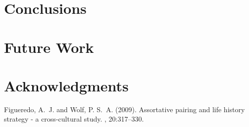 \documentclass[twoside]{article}
\begin{document}
\begin{multicols}{2}
            \section{Conclusions}

            \section{Future Work}

            \section{Acknowledgments}





\begin{thebibliography}{99} %

Figueredo, A.~J. and Wolf, P. S.~A. (2009).
\newblock Assortative pairing and life history strategy - a cross-cultural
study.
, 20:317--330.

\end{thebibliography}


\end{multicols}
\end{document}
